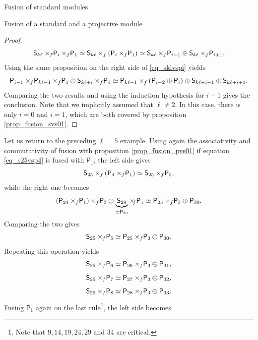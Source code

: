 \documentclass[reqno]{amsart}
\newcommand{\ds}[1]{\mathsf S_{#1}}
\newcommand{\dP}[1]{\mathsf P_{#1}}
\newcommand{\xf}{\times\hspace{-0.27em}_f}
\newcommand{\lc}{\ell}
\begin{document}
\begin{section}{Fusion of standard modules}
\begin{subsection}{Fusion of a standard and a projective module}
\begin{proof}
\begin{equation}
\ds{ k \lc} \xf \dP{i} \xf \dP{1} \simeq \ds{ k \lc} \xf \left(\dP{i} \xf \dP{1}\right) \simeq \ds{k \lc} \xf \dP{i-1} \oplus \ds{ k \lc } \xf \dP{i+1}.
\end{equation}
Using the same proposition on the right side of \eqref{eq_sklvspi} yields
\begin{equation}
\dP{i-1} \xf \dP{k \lc -1} \xf \dP{1} \oplus \ds{ k \lc +i}\xf \dP{1} \simeq \dP{k \lc -1} \xf \left(\dP{i-2} \oplus \dP{i}\right) \oplus \ds{k \lc +i-1} \oplus \ds{k \lc +i+1}.
\end{equation}
Comparing the two results and using the induction hypothesis for $i-1$ gives the conclusion. Note that we implicitly assumed that $\lc \neq 2$. In this case, there is only $i=0$ and $i=1$, which are both covered by proposition \ref{prop_fusion_svs01}.
\end{proof}
Let us return to the preceding $\lc=5$ example. Using again the associativity and commutativity of fusion with proposition \ref{prop_fusion_pvs01} if equation \eqref{eq_s25vsp4} is fused with $\dP{1}$, the left side gives
\begin{equation}
\ds{25}\xf \left(\dP{4} \xf \dP{1}\right) \simeq \ds{25} \xf \dP{5}, 
\end{equation}
while the right one becomes
\begin{equation}
\left(\dP{24}\xf \dP{1}\right) \xf \dP{3}  \oplus \underbrace{\ds{29}}_{\simeq \dP{29}} \xf \dP{1} \simeq \dP{25}\xf \dP{3} \oplus \dP{30}.  
\end{equation}
Comparing the two gives
\begin{equation}
	 \ds{25} \xf \dP{5} \simeq \dP{25}\xf \dP{3} \oplus \dP{30}.
\end{equation}
Repeating this operation yields
\begin{equation}
\ds{25} \xf \dP{6} \simeq \dP{26} \xf \dP{3}  \oplus \dP{31}\text{,}
\end{equation}
\begin{equation}
\ds{25} \xf \dP{7} \simeq \dP{27} \xf \dP{3} \oplus \dP{32}\text{,}
\end{equation}
\begin{equation}
\ds{25} \xf \dP{8} \simeq \dP{28} \xf \dP{3} \oplus \dP{33}\text{.}
\end{equation}
Fusing $\dP{1}$ again on the last rule\footnote{Note that $9,14,19,24,29$ and $34$ are critical.}, the left side becomes
\begin{equation}

\end{equation}
\end{subsection}
\end{section}
\end{document}
